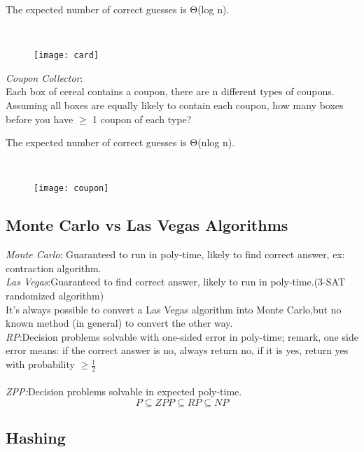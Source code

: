\begin{claim}
    The expected number of correct guesses is Θ(log n).
\end{claim}\\

\begin{figure}[H]
    \centering
    \texttt{[image: card]}
\end{figure}

\emph{Coupon Collector}:\\
Each box of cereal contains a coupon, there are n different types of coupons. Assuming all boxes are equally likely to contain each coupon, how many boxes before you have $\geq$ 1 coupon of each type?

\begin{claim}
    The expected number of correct guesses is Θ(nlog n).
\end{claim}\\

\begin{figure}[H]
    \centering
    \texttt{[image: coupon]}
\end{figure}

\subsection{Monte Carlo vs Las Vegas Algorithms}

\emph{Monte Carlo}: Guaranteed to run in poly-time, likely to find correct answer, ex: contraction algorithm.\\
\emph{Las Vegas}:Guaranteed to find correct answer, likely to run in poly-time.(3-SAT randomized algorithm)\\

It's always possible to convert a Las Vegas algorithm into Monte Carlo,but no known method (in general) to convert the other way.\\

\emph{RP}:Decision problems solvable with one-sided error in poly-time; remark, one side error means: if the correct answer is no, always return no, if it is yes, return yes with probability $\geq \frac{1}{2}$\\\\
\emph{ZPP:}Decision problems solvable in expected poly-time.\\

\[ P \subseteq ZPP \subseteq RP \subseteq NP \]

\subsection{Hashing}

